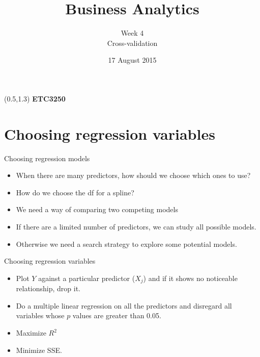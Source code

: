 \documentclass[14pt]{beamer}
\title[4. Cross-validation]{Business Analytics}
\author{Week 4\\ Cross-validation}
\date{17 August 2015}
\makeatletter
\def\biz{\begin{itemize}[<+-| alert@+>]}
\def\eiz{\end{itemize}}
\makeatother
\begin{document}
\begin{frame}[plain]{}
\maketitle
\begin{textblock}{11}(0.5,1.3){\color{white}\large
\textbf{ETC3250}}
\end{textblock}
\end{frame}


\section{Choosing regression variables}

\begin{frame}{Choosing regression models}
\biz
\item When there are many predictors, how should we choose which ones to use?

\item How do we choose the df for a spline?

\item We need a way of comparing two competing models

\item If there are a limited number of predictors, we can study all possible models.

\item Otherwise we need a search strategy to explore some potential models.
\eiz

\end{frame}


\begin{frame}{Choosing regression variables}


\biz
\item Plot $Y$ against a particular predictor ($X_j$)
       and if it shows no noticeable relationship,  drop it.


\item Do a multiple linear regression on all the predictors
      and
      disregard all variables whose  $p$ values are greater than 0.05.

\item Maximize $R^2$

\item Minimize SSE.
\eiz
\end{frame}%
\end{document}
